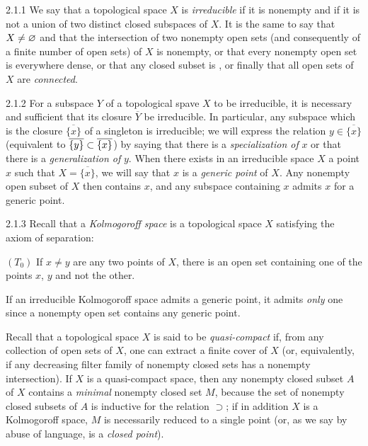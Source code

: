 \documentclass[../main.tex]{subfiles}
\begin{document}
\begin{cx}{2.1.1}
We say that a topological space $X$ is \emph{irreducible} if it is nonempty and
if it is not a union of two distinct closed subspaces of $X$. It is the same to say
that $X\neq\varnothing$ and that the intersection of two nonempty open sets (and consequently
of a finite number of open sets) of $X$ is nonempty, or that every nonempty open set
is everywhere dense, or that any closed subset is , or finally
that all open sets of $X$ are \emph{connected}.
\end{cx}

\begin{cx}{2.1.2}
For a subspace $Y$ of a topological spave $X$ to be irreducible, it is necessary and
sufficient that its closure $\overline{Y}$ be irreducible. In particular, any subspace
which is the closure $\overline{\{x\}}$ of a singleton is irreducible;
we will express the relation $y\in\overline{\{x\}}$ (equivalent to
$\overline{\{y\}}\subset\overline{\{x\}}$) by saying that there is a \emph{specialization of}
$x$ or that there is a \emph{generalization of} $y$. When there exists in an irreducible
space $X$ a point $x$ such that $X=\overline{\{x\}}$, we will say that $x$ is a
\emph{generic point} of $X$. Any nonempty open subset of $X$ then contains $x$, and any
subspace containing $x$ admits $x$ for a generic point.
\end{cx}

\begin{cx}{2.1.3}
Recall that a \emph{Kolmogoroff space} is a topological space $X$ satisfying the axiom
of separation:

$(T_0)$ If $x\neq y$ are any two points of $X$, there is an open set containing one of
the points $x$, $y$ and not the other.

If an irreducible Kolmogoroff space admits a generic point, it admits \emph{only} one
since a nonempty open set contains any generic point.

Recall that a topological space $X$ is said to be \emph{quasi-compact} if, from any
collection of open sets of $X$, one can extract a finite cover of $X$ (or, equivalently,
if any decreasing filter family of nonempty closed sets has a nonempty intersection). If
$X$ is a quasi-compact space, then any nonempty closed subset $A$ of $X$ contains a \emph{minimal}
nonempty closed set $M$, because the set of nonempty closed subsets of $A$ is inductive for
the relation $\supset$; if in addition $X$ is a Kolmogoroff space, $M$ is necessarily reduced
to a single point (or, as we say by abuse of language, is a \emph{closed point}).
\end{cx}
\end{document}

